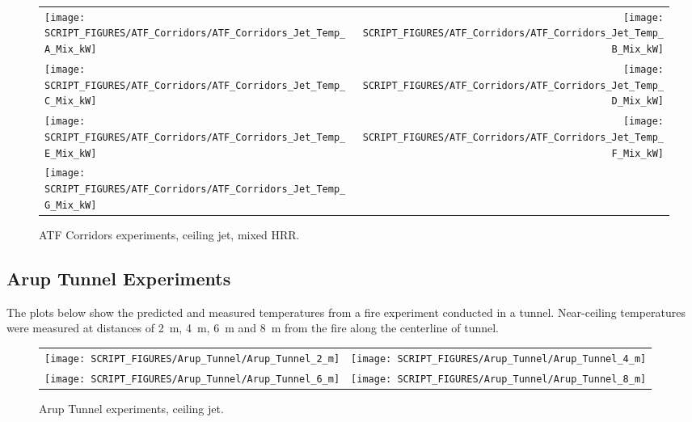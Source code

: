 \begin{figure}[p]
\begin{tabular*}{\textwidth}{l@{\extracolsep{\fill}}r}
\texttt{[image: SCRIPT\_FIGURES/ATF\_Corridors/ATF\_Corridors\_Jet\_Temp\_A\_Mix\_kW]} &
\texttt{[image: SCRIPT\_FIGURES/ATF\_Corridors/ATF\_Corridors\_Jet\_Temp\_B\_Mix\_kW]} \\
\texttt{[image: SCRIPT\_FIGURES/ATF\_Corridors/ATF\_Corridors\_Jet\_Temp\_C\_Mix\_kW]} &
\texttt{[image: SCRIPT\_FIGURES/ATF\_Corridors/ATF\_Corridors\_Jet\_Temp\_D\_Mix\_kW]} \\
\texttt{[image: SCRIPT\_FIGURES/ATF\_Corridors/ATF\_Corridors\_Jet\_Temp\_E\_Mix\_kW]} &
\texttt{[image: SCRIPT\_FIGURES/ATF\_Corridors/ATF\_Corridors\_Jet\_Temp\_F\_Mix\_kW]} \\
\texttt{[image: SCRIPT\_FIGURES/ATF\_Corridors/ATF\_Corridors\_Jet\_Temp\_G\_Mix\_kW]} &
\end{tabular*}
\caption[ATF Corridors experiments, ceiling jet, mixed HRR]
{ATF Corridors experiments, ceiling jet, mixed HRR.}
\label{ATF_Corridors_Jet_Temp_Mix_kW}
\end{figure}


\clearpage

\subsection{Arup Tunnel Experiments}

The plots below show the predicted and measured temperatures from a fire experiment conducted in a tunnel. Near-ceiling temperatures
were measured at distances of 2~m, 4~m, 6~m and 8~m from the fire along the centerline of tunnel.

\begin{figure}[!h]
\begin{tabular*}{\textwidth}{l@{\extracolsep{\fill}}r}
\texttt{[image: SCRIPT\_FIGURES/Arup\_Tunnel/Arup\_Tunnel\_2\_m]} &
\texttt{[image: SCRIPT\_FIGURES/Arup\_Tunnel/Arup\_Tunnel\_4\_m]} \\
\texttt{[image: SCRIPT\_FIGURES/Arup\_Tunnel/Arup\_Tunnel\_6\_m]} &
\texttt{[image: SCRIPT\_FIGURES/Arup\_Tunnel/Arup\_Tunnel\_8\_m]}
\end{tabular*}
\caption[Arup Tunnel experiments, ceiling jet]
{Arup Tunnel experiments, ceiling jet.}
\label{Arup_Tunnel}
\end{figure}

\clearpage


